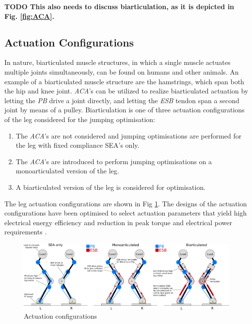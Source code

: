\documentclass[letterpaper, 10 pt, conference]{ieeeconf}  %
\begin{document}
 \textbf{TODO This also needs to discuss biarticulation, as it is depicted in Fig. \ref{fig:ACA}.}

\subsection{Actuation Configurations}
In nature, biarticulated muscle structures, in which a single muscle actuates multiple joints simultaneously, can be found on humans and other animals. An example of a biarticulated muscle structure are the hamstrings, which span both the hip and knee joint. \textit{ACA}'s can be utilized to realize biarticulated actuation by letting the \textit{PB} drive a joint directly, and letting the \textit{ESB} tendon span a second joint by means of a pulley. Biarticulation is one of three actuation configurations of the leg considered for the jumping optimisation:

\begin{enumerate}
	\item The \textit{ACA}'s are not considered and jumping optimisations are performed for the leg with fixed compliance SEA's only.
	\item The \textit{ACA}'s are introduced to perform jumping optimisations on a monoarticulated version of the leg. 
	\item A biarticulated version of the leg is considered for optimisation.
\end{enumerate}
The leg actuation configurations are shown in Fig \ref{fig:configurations}. The designs of the actuation configurations have been optimised to select actuation
parameters that yield high electrical energy efficiency and reduction in peak torque and electrical power requirements \cite{roozing2016design}.



\begin{figure}[ht]
	\centering
	\includegraphics[width=\linewidth]{3-DoF_leg_concept}
	\caption{Actuation configurations}
	\label{fig:configurations}
\end{figure}
\end{document}
